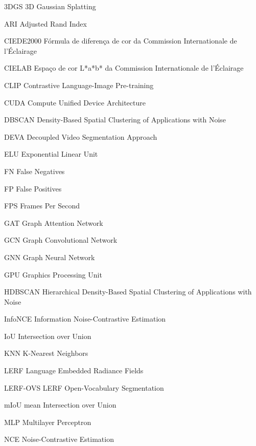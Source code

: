 \listoffigures*
\cleardoublepage

\listoftables*
\cleardoublepage

\begin{siglas}
    \item[3DGS] 3D Gaussian Splatting
    \item[ARI] Adjusted Rand Index
    \item[CIEDE2000] Fórmula de diferença de cor da Commission Internationale de l'Éclairage
    \item[CIELAB] Espaço de cor L*a*b* da Commission Internationale de l'Éclairage
    \item[CLIP] Contrastive Language-Image Pre-training
    \item[CUDA] Compute Unified Device Architecture
    \item[DBSCAN] Density-Based Spatial Clustering of Applications with Noise
    \item[DEVA] Decoupled Video Segmentation Approach
    \item[ELU] Exponential Linear Unit
    \item[FN] False Negatives
    \item[FP] False Positives
    \item[FPS] Frames Per Second
    \item[GAT] Graph Attention Network
    \item[GCN] Graph Convolutional Network
    \item[GNN] Graph Neural Network
    \item[GPU] Graphics Processing Unit
    \item[HDBSCAN] Hierarchical Density-Based Spatial Clustering of Applications with Noise
    \item[InfoNCE] Information Noise-Contrastive Estimation
    \item[IoU] Intersection over Union
    \item[KNN] K-Nearest Neighbors
    \item[LERF] Language Embedded Radiance Fields
    \item[LERF-OVS] LERF Open-Vocabulary Segmentation
    \item[mIoU] mean Intersection over Union
    \item[MLP] Multilayer Perceptron
    \item[NCE] Noise-Contrastive Estimation

\end{siglas}
